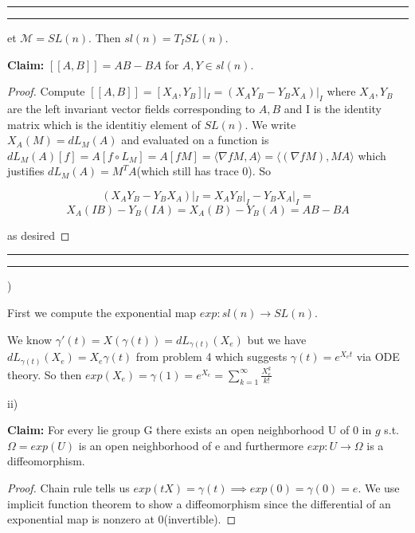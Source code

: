 \documentclass[11pt]{article}
\newcommand{\m}{\mathcal{M}}
\newcommand{\question}[2] {\vspace{.25in} \hrule\vspace{0.5em}
\noindent{\bf #1: #2} \vspace{0.5em}
\hrule \vspace{.10in}}
\begin{document}
\question{Question 4}


Set $\m = SL(n)$. Then $sl(n) = T_I SL(n)$. 

\textbf{Claim:} $[[A,B]] = AB-BA$ for $A,Y \in sl(n)$.

\begin{proof}

Compute $[[A,B]] = [X_A,Y_B]|_I= (X_AY_B - Y_BX_A)|_I$ where $X_A,Y_B$ are the left invariant vector fields corresponding to $A,B$ and I is the identity matrix which is the identitiy element of $SL(n)$. We write $X_A(M) = dL_M (A)$ and evaluated on a function is $dL_M(A)[f] = A[f \circ L_M] = A[f M] = \langle \nabla f M, A\rangle = \langle (\nabla f M), MA\rangle$ which justifies $dL_M(A) = M^TA$(which still has trace 0). So

\[
	(X_AY_B - Y_BX_A)|_I = X_AY_B|_I - Y_BX_A|_I =
\]
\[
	X_A(IB) - Y_B(IA) = X_A(B)-Y_B(A) = AB - BA
\]

as desired

\end{proof}


\question{Question 5}


i) 

First we compute the exponential map $exp : sl(n) \to SL(n)$. 

We know $\gamma'(t) = X(\gamma(t)) = dL_{\gamma(t)}(X_e)$ but we have $dL_{\gamma(t)}(X_e) = X_e \gamma(t)$ from problem 4 which suggests $\gamma(t) =  e^{X_et}$ via ODE theory. So then $exp(X_e) = \gamma(1) = e^{X_e} = \sum_{k=1}^{\infty} \frac{X_e^k}{k!}$

ii)


\textbf{Claim:} For every lie group G there exists an open neighborhood U of 0 in $g$ s.t. $\Omega = exp(U)$ is an open neighborhood of e and furthermore $exp: U \to \Omega$ is a diffeomorphism.

\begin{proof}

Chain rule tells us $exp(tX) = \gamma(t) \implies exp(0) = \gamma(0) = e$. We use implicit function theorem to show a diffeomorphism since the differential of an exponential map is nonzero at 0(invertible).

\end{proof}
\end{document}
